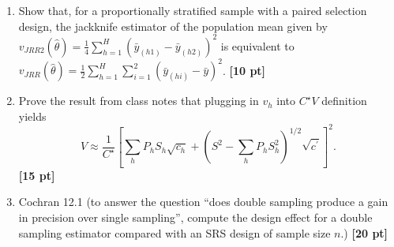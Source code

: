 \documentclass[12pt]{article}
\begin{document}
\begin{enumerate}
	\begin{enumerate}[itemsep=5ex]
	\item Using the data DIOXIN2.DAT, compute $(X^\top W X)^{-1}$  {\bf [10 pt]}
	\item Again using the data DIOXIN2.DAT, compute $\sigma^4 v(U_w ({\bf b_w}))$ where ${\bf b}_w$ is the estimator of the linear regression parameters of $\log (\text{TCDD})$ on age and $U$ is the score function.  {\bf [10 pt]}
	\item Using the results of (a) and (b), compute $v({\bf b}_w)$ and compare the square root of the diagonal elements of $v({\bf b}_w)$ with the results on the slides {\bf [10 pt]}
	\end{enumerate}
\item Show that, for a proportionally stratified sample with a paired selection design, the jackknife estimator of the population mean given by $v_{JRR2} (\hat \theta) = \frac{1}{4} \sum_{h=1}^H ( \bar y_{(h1)} - \bar y_{(h2)})^2$ is equivalent to $v_{JRR} (\hat \theta) = \frac{1}{2} \sum_{h=1}^H \sum_{i=1}^2 \left( \bar y_{(hi)} - \bar y \right)^2$. {\bf [10 pt]}
\item Prove the result from class notes that plugging in $v_h$ into $C^\star V$ definition yields
$$
V \approx \frac{1}{C^\star} \left[ \sum_h P_h S_h \sqrt{c_h} + \left(S^2 - \sum_h P_h S_h^2 \right)^{1/2} \sqrt{c^\prime} \right]^2.
$$
{\bf [15 pt]}
\item Cochran 12.1 (to answer the question ``does double sampling produce a gain in precision over single sampling'', compute the design effect for a double sampling estimator compared with an SRS design of sample size $n$.) {\bf [20 pt]}
\end{enumerate}
\end{document}
